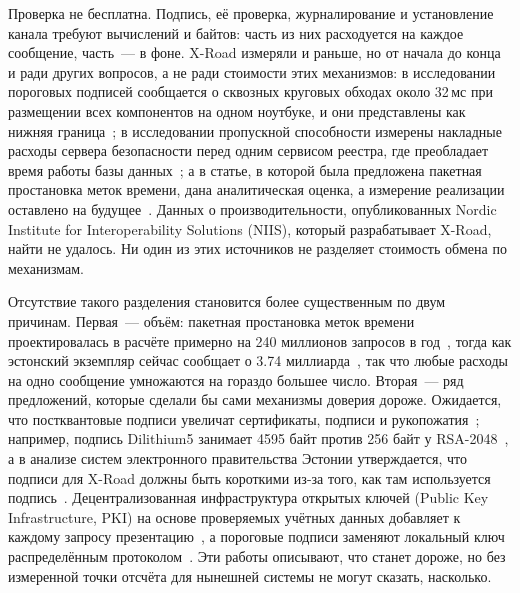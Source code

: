 \documentclass[conference,a4paper]{IEEEtran}
\newcommand{\newtext}[1]{{\color{blue}#1}}
\begin{document}
Проверка не бесплатна. Подпись, её проверка, журналирование и установление канала требуют
вычислений и байтов: часть из них расходуется на каждое сообщение, часть~--- в фоне. X-Road измеряли и
раньше, но от начала до конца и ради других вопросов, а не ради стоимости этих механизмов: в
исследовании пороговых подписей сообщается о сквозных круговых обходах около 32\,мс при размещении
всех компонентов на одном ноутбуке, и они представлены как нижняя граница~\cite{bakhtina2026ijis}; в
исследовании пропускной способности измерены накладные расходы сервера безопасности перед одним
сервисом реестра, где преобладает время работы базы данных~\cite{taklai2020}; а в статье, в которой
была предложена пакетная простановка меток времени, дана аналитическая оценка, а измерение реализации
оставлено на будущее~\cite{ansper2013}. Данных о производительности, опубликованных Nordic Institute
for Interoperability Solutions (NIIS), который разрабатывает X-Road, найти не удалось. Ни один из
этих источников не разделяет стоимость обмена по механизмам.

Отсутствие такого разделения становится более существенным по двум причинам. Первая~--- объём:
пакетная простановка меток времени проектировалась в расчёте примерно на 240 миллионов запросов в
год~\cite{ansper2013}, тогда как эстонский экземпляр сейчас сообщает о 3.74 миллиарда~\cite{xteefactsheet},
так что любые расходы на одно сообщение умножаются на гораздо большее число. Вторая~--- ряд
предложений, которые сделали бы сами механизмы доверия дороже. Ожидается, что постквантовые подписи
увеличат сертификаты, подписи и рукопожатия~\cite{bakhtina2026pqc,snetkov2023}; например, подпись
Dilithium5 занимает 4595 байт против 256 байт у RSA-2048~\cite{snetkov2023}, \newtext{а в анализе
систем электронного правительства Эстонии утверждается, что подписи для X-Road должны быть
короткими из-за того, как там используется подпись~\cite{vakarjuk2024}}. Децентрализованная
инфраструктура открытых ключей (Public Key Infrastructure, PKI) на основе проверяемых учётных данных
добавляет к каждому запросу презентацию~\cite{bakhtina2023ares}, а пороговые подписи заменяют локальный ключ
распределённым протоколом~\cite{bakhtina2026ijis}. Эти работы описывают, что станет дороже, но без
измеренной точки отсчёта для нынешней системы не могут сказать, насколько.
\end{document}

